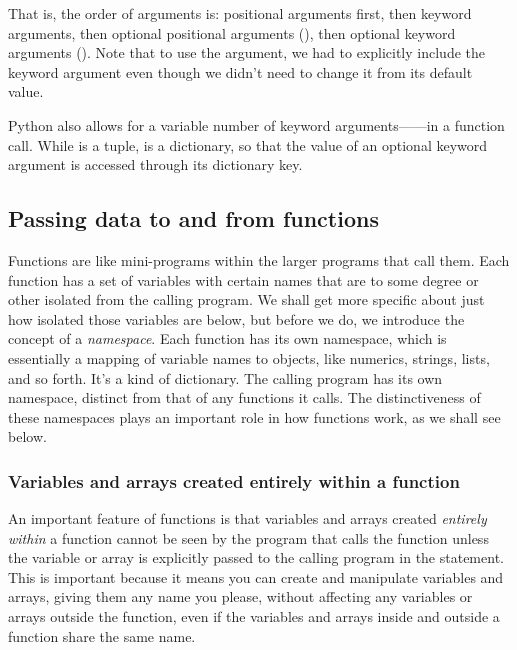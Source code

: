 \documentclass[letterpaper,10pt,english]{sphinxmanual}
\begin{document}
That is, the order of arguments is: positional arguments first, then keyword arguments, then optional positional arguments (), then optional keyword arguments ().  Note that to use the  argument, we had to explicitly include the keyword argument  even though we didn't need to change it from its default value.

Python also allows for a variable number of keyword arguments------in a function call.  While  is a tuple,  is a dictionary, so that the value of an optional keyword argument is accessed through its dictionary key.


\subsection{Passing data to and from functions}
\label{chap7/chap7_funcs:passing-data-to-and-from-functions}
Functions are like mini-programs within the larger programs that call them.  Each function has a set of variables with certain names that are to some degree or other isolated from the calling program.  We shall get more specific about just how isolated those variables are below, but before we do, we introduce the concept of a \emph{namespace}.  Each function has its own namespace, which is essentially a mapping of variable names to objects, like numerics, strings, lists, and so forth.  It's a kind of dictionary.  The calling program has its own namespace, distinct from that of any functions it calls.  The distinctiveness of these namespaces plays an important role in how functions work, as we shall see below.


\subsubsection{Variables and arrays created entirely within a function}
\label{chap7/chap7_funcs:variables-and-arrays-created-entirely-within-a-function}
An important feature of functions is that variables and arrays created \emph{entirely within} a function cannot be seen by the program that calls the function unless the variable or array is explicitly passed to the calling program in the  statement.  This is important because it means you can create and manipulate variables and arrays, giving them any name you please, without affecting any variables or arrays outside the function, even if the variables and arrays inside and outside a function share the same name.
\end{document}
